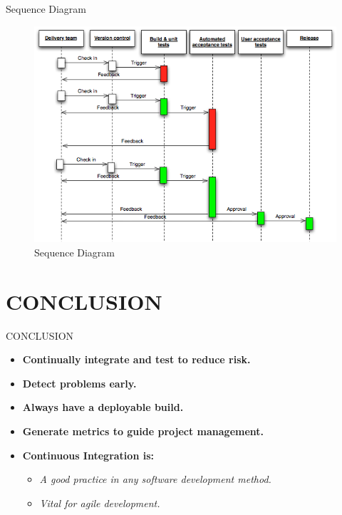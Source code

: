 \documentclass{beamer}
\begin{document}
\begin{frame}{Sequence Diagram}

\begin{figure}[h]
\begin{center}
\includegraphics[scale=0.5]{sequence.png}
\caption{Sequence Diagram}
\end{center}
\end{figure}
\end{frame}

\section{CONCLUSION}
\begin{frame}{CONCLUSION}
\begin{itemize}
\vspace{10pt}
\item  \textbf{Continually integrate and test to reduce risk.}
\vspace{10pt}
\item  \textbf{Detect problems early.}
\vspace{10pt}
\item  \textbf{Always have a deployable build.}
\vspace{10pt}
\item  \textbf{Generate metrics to guide project management.}
\vspace{10pt}
\item   \textbf{Continuous Integration is:}
\begin{itemize}
\vspace{10pt}
\item \textit{A good practice in any software development method.}
\vspace{10pt}
\item \textit{Vital for agile development.}
\end{itemize}
\end{itemize}
\end{frame}
\end{document}
